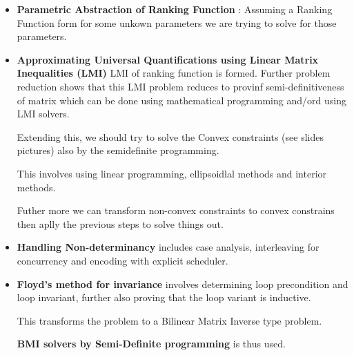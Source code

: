 \begin{itemize}
{\begin{itemize}
{	Yakubovich’s procedure is often used to prove the completeness.
	}

	\item{\textbf{Parametric Abstraction of Ranking Function} :
	Assuming a Ranking Function form for some unkown parameters we are trying to solve for those parameters.
	}

	\item{\textbf{Approximating Universal Quantifications using Linear Matrix Inequalities (LMI)} 
	LMI of ranking function is formed. Further problem reduction shows that this LMI problem reduces to provinf semi-definitiveness of matrix which can be done using mathematical programming and/ord using LMI solvers.

	Extending this, we should try to solve the Convex constraints (see slides pictures) also by the semidefinite programming. 

	This involves using linear programming, ellipsoidlal methods and interior methods.

	Futher more we can transform non-convex constraints to convex constrains then aplly the previous steps to solve things out.
	}
	
	\item{\textbf{Handling Non-determinancy} includes case analysis, interleaving for concurrency and encoding with explicit scheduler.}

	\item{\textbf{Floyd's method for invariance } involves determining loop precondition and loop invariant, further also proving that the loop variant is inductive.

	This transforms the problem to a Bilinear Matrix Inverse type problem.

	\textbf{BMI solvers by Semi-Definite programming} is thus used. 
	}

	\end{itemize}
	}

\end{itemize}

